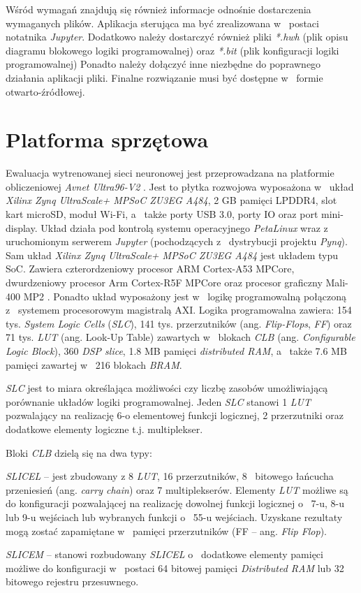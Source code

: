 Wśród wymagań znajdują się również informacje odnośnie dostarczenia wymaganych plików.
Aplikacja sterująca ma być zrealizowana w~ postaci notatnika \emph{Jupyter}.
Dodatkowo należy dostarczyć również pliki \emph{*.hwh} (plik opisu diagramu blokowego logiki programowalnej)
oraz \emph{*.bit} (plik konfiguracji logiki programowalnej) Ponadto należy dołączyć inne niezbędne do poprawnego działania aplikacji pliki. 
Finalne rozwiązanie musi być dostępne w~ formie otwarto-źródłowej.

\section{Platforma sprzętowa}
Ewaluacja wytrenowanej sieci neuronowej jest przeprowadzana na platformie obliczeniowej \emph{Avnet Ultra96-V2} \cite{avnet_ultra96}. 
Jest to płytka rozwojowa wyposażona w~ układ \emph{Xilinx Zynq UltraScale+ MPSoC ZU3EG A484}, 2 GB pamięci LPDDR4, slot kart microSD, moduł Wi-Fi, a~ także porty USB 3.0, porty IO oraz port mini-display. 
Układ działa pod kontrolą systemu operacyjnego \emph{PetaLinux} wraz z~ uruchomionym serwerem \emph{Jupyter} (pochodzących z~ dystrybucji projektu \emph{Pynq}\cite{pynq}). 
Sam układ \emph{Xilinx Zynq UltraScale+ MPSoC ZU3EG A484} jest układem typu SoC. 
Zawiera czterordzeniowy procesor ARM Cortex-A53 MPCore, dwurdzeniowy procesor Arm Cortex-R5F MPCore oraz procesor graficzny Mali-400 MP2 \cite{zynq_product_guide}. 
Ponadto układ wyposażony jest w~ logikę programowalną połączoną z~ systemem procesorowym magistralą AXI. 
Logika programowalna zawiera: 
154 tys. \emph{System Logic Cells} (\emph{SLC}), 
141 tys. przerzutników (ang. \emph{Flip-Flops}, \emph{FF}) 
oraz 71 tys. \emph{LUT} (ang. Look-Up Table) zawartych w~ blokach \emph{CLB} (ang. \emph{Configurable Logic Block}), 360 \emph{DSP slice}, 1.8 MB pamięci \emph{distributed RAM}, a~ także 7.6 MB pamięci zawartej w~ 216 blokach \emph{BRAM}. 

\emph{SLC} jest to miara określająca możliwości czy liczbę zasobów umożliwiającą porównanie układów logiki programowalnej.
Jeden \emph{SLC} stanowi 1 \emph{LUT} pozwalający na realizację 6-o elementowej funkcji logicznej, 2 przerzutniki oraz dodatkowe elementy logiczne t.j. multiplekser. 

Bloki \emph{CLB} \cite{clb} dzielą się na dwa typy:
\begin{description}
\item \emph{SLICEL} -- jest zbudowany z 8 \emph{LUT}, 16 przerzutników, 8~ bitowego łańcucha przeniesień (ang. \emph{carry chain}) oraz 7 multiplekserów. 
Elementy \emph{LUT} możliwe są do konfiguracji pozwalającej na realizację dowolnej funkcji logicznej o~ 7-u, 8-u lub 9-u wejściach lub wybranych funkcji o~ 55-u wejściach. 
Uzyskane rezultaty mogą zostać zapamiętane w~ pamięci przerzutników (FF -- ang. \textit{Flip Flop}).
\item \emph{SLICEM} -- stanowi rozbudowany \emph{SLICEL} o~ dodatkowe elementy pamięci możliwe do konfiguracji w~ postaci 64 bitowej pamięci \emph{Distributed RAM} lub 32 bitowego rejestru przesuwnego. 
\end{description}

